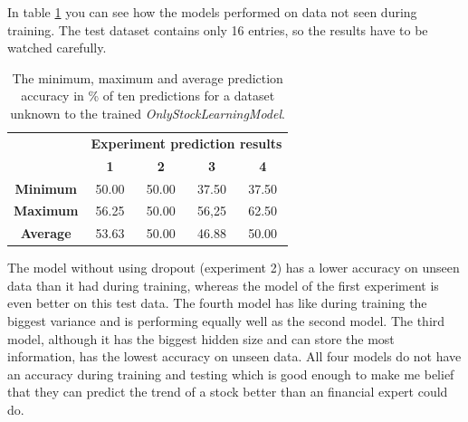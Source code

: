 In table \ref{tbl:oslmpredictresults} you can see how the models performed on data not seen during training. The test dataset contains only 16 entries, so the results have to be watched carefully.
\begin{table}[!ht]
	\begin{center}
		\begin{tabular}{c|c|c|c|c|}
			\multirow{2}{1cm}{} & \multicolumn{4}{c|}{\textbf{Experiment prediction results}} \\
			& \textbf{1} & \textbf{2} & \textbf{3} & \textbf{4}\\
			\hline
			\textbf{Minimum} & 50.00 & 50.00 & 37.50 & 37.50 \\
			\hline
			\textbf{Maximum} & 56.25 & 50.00 & 56,25 & 62.50 \\
			\hline
			\textbf{Average} & 53.63 & 50.00 & 46.88 & 50.00 \\
		\end{tabular}
	\end{center}
	\caption{The minimum, maximum and average prediction accuracy in \% of ten predictions for a dataset unknown to the trained \textit{OnlyStockLearningModel}. }
	\label{tbl:oslmpredictresults}
\end{table}
The model without using dropout (experiment 2) has a lower accuracy on unseen data than it had during training, whereas the model of the first experiment is even better on this test data. The fourth model has like during training the biggest variance and is performing equally well as the second model. The third model, although it has the biggest hidden size and can store the most information, has the lowest accuracy on unseen data. All four models do not have an accuracy during training and testing which is good enough to make me belief that they can predict the trend of a stock better than an financial expert could do.


